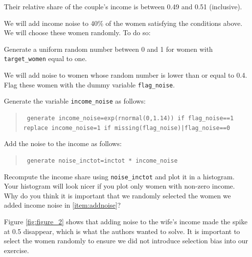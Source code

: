 \documentclass[a4paper, 11pt,addpoints]{exam}
\begin{document}
\begin{questions}
			\item Their relative share of the couple's income is between 0.49 and 0.51 (inclusive).
 		\eitem   
 		\item \label{item:addnoise} We will add  income noise to 40\% of the women satisfying the conditions above. We will choose these women randomly. To do so:
		\bitem 
		\item Generate a uniform random number between 0 and 1 for women with {\tt target\_women} equal to one. 
		\item We will add noise to women whose random number is lower than or equal to 0.4. Flag these women with the dummy variable {\tt flag\_noise}.
		\item Generate the variable {\tt income\_noise} as follows:
		\begin{quote} 
			{\tt
			generate income\_noise=exp(rnormal(0,1.14)) if flag\_noise==1 \\
			replace  income\_noise=1 if missing(flag\_noise)|flag\_noise==0
		}
		\end{quote}
		\item Add the noise to the income as follows:
		\begin{quote} 
			{\tt
				generate noise\_inctot=inctot * income\_noise
			}
		\end{quote}
		\eitem 
	\eenu 
	Recompute the income share using {\tt noise\_inctot} and plot it in a histogram. Your histogram will look nicer if you plot only women with non-zero income. Why do you think it is important that we randomly selected the women we added income noise in \ref{item:addnoise}?
	\begin{solution}
		Figure \ref{fig:figure_2} shows that adding noise to the wife's income made the spike at 0.5 disappear, which is what the authors wanted to solve. It is important to select the women randomly to ensure we did not introduce selection bias into our exercise.
	
		
	\end{solution}
\newpage

\end{questions}
\end{document}
